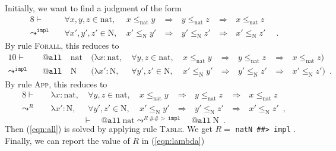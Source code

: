 \documentclass{llncs}
\begin{document}
\begin{example}
    Initially, we want to find a judgment of the form
    \begin{alignat*}{8}
    \vdash \quad &
        \forall x, y, z \in \mathrm{nat},~&
        x \leq_{\mathrm{nat}} y~& \Rightarrow~&
        y \leq_{\mathrm{nat}} z~& \Rightarrow~& x \leq_{\mathrm{nat}} z & \\
    \leadsto^{\mathtt{impl}} \quad &
        \forall x', y', z' \in \mathrm{N},~&
        x' \leq_{\mathrm{N}} y'~& \Rightarrow~&
        y' \leq_{\mathrm{N}} z'~& \Rightarrow~& x' \leq_{\mathrm{N}} z' &
        \enspace .
    \end{alignat*}
    By rule \textsc{Forall}, this reduces to
    \begin{alignat*}{10}
    \vdash \quad &
        \mathtt{@all}~& \mathrm{nat}~&
        (
        \mathrm{\lambda} x : \mathrm{nat},~&
        \forall y, z \in \mathrm{nat},~&
        x \leq_{\mathrm{nat}} y~& \Rightarrow~&
        y \leq_{\mathrm{nat}} z~& \Rightarrow~& x \leq_{\mathrm{nat}} z
        ) \\
    \leadsto^{\mathtt{impl}} \quad &
        \mathtt{@all}~& \mathrm{N}~&
        (
        \mathrm{\lambda} x' : \mathrm{N},~&
        \forall y', z' \in \mathrm{N},~&
        x' \leq_{\mathrm{N}} y'~& \Rightarrow~&
        y' \leq_{\mathrm{N}} z'~& \Rightarrow~& x' \leq_{\mathrm{N}} z'
        ) \enspace .
    \end{alignat*}
    By rule \textsc{App}, this reduces to
    \begin{alignat}{8}
    \vdash \quad &
        \mathrm{\lambda} x : \mathrm{nat},~&
        \forall y, z \in \mathrm{nat},~&
        x \leq_{\mathrm{nat}} y~& \Rightarrow~&
        y \leq_{\mathrm{nat}} z~& \Rightarrow~& x \leq_{\mathrm{nat}} z
        \nonumber \\
    \leadsto^{R} \quad &
        \mathrm{\lambda} x' : \mathrm{N},~&
        \forall y', z' \in \mathrm{N},~&
        x' \leq_{\mathrm{N}} y'~& \Rightarrow~&
        y' \leq_{\mathrm{N}} z'~& \Rightarrow~& x' \leq_{\mathrm{N}} z'
        \enspace ,
    \label{eqn:lambda}
    \end{alignat}
    \begin{equation}
    \vdash \quad \mathtt{@all}~\mathrm{nat}
    \leadsto^{R~\#\#>~\mathtt{impl}} \quad \mathtt{@all}~\mathrm{N}
    \enspace .
    \label{eqn:all}
    \end{equation}
    Then (\ref{eqn:all}) is solved by applying rule \textsc{Table}.
    We get $R =$ \verb|natN ##> impl| .
    Finally, we can report the value of $R$ in (\ref{eqn:lambda})

\end{example}
\end{document}
